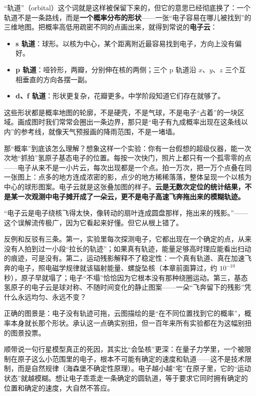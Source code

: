 “轨道”（orbital）这个词就是这样被保留下来的，但它的意思已经彻底换了：一个轨道不是一条路线，而是\textbf{一个概率分布的形状}——一张“电子容易在哪儿被找到”的三维地图。把概率高低用疏密不同的点画出来，就得到常说的\textbf{电子云}：

\begin{itemize}[itemsep=2pt]
\item \textbf{s 轨道}：球形。以核为中心，某个距离附近最容易找到电子，方向上没有偏好。
\item \textbf{p 轨道}：哑铃形，两瓣，分别伸在核的两侧；三个 p 轨道沿 $x$、$y$、$z$ 三个互相垂直的方向各摆一副。
\item \textbf{d、f 轨道}：形状更复杂，花瓣更多。中学阶段知道它们存在就够了。
\end{itemize}

这些形状都是概率地图的轮廓，不是硬壳，不是气球，不是电子“占着”的一块区域。画成图时我们常常会圈出一条边界，那只是“电子有九成概率出现在这条线以内”的参考线，就像天气预报画的降雨范围，不是一堵墙。

那“概率”到底该怎么理解？想象这样一个实验：你有一台假想的超级仪器，能一次次地“抓拍”氢原子基态电子的位置。每按一次快门，照片上都只有一个孤零零的点——电子从来不是一小片云，每次出现都是一个点。拍一万次，把一万个点叠在同一张图上：点多的地方连成浓密的影，点少的地方稀稀落落，整体呈现一个以核为中心的球形图案。电子云就是这张叠加图的样子。\textbf{云是无数次定位的统计结果，不是某一次观测中电子摊开成了一朵云，更不是电子高速飞奔拖出来的模糊轨迹。}

\begin{wuqu}
“电子云是电子绕核飞得太快，像转动的扇叶连成圆盘那样，拖出来的残影。”——这个误解流传极广，因为它看起来好懂。但它从根上错了。

反例和反驳有三条。第一，实验里每次探测电子，它都出现在一个确定的点，从来没有人拍到过一小段“拉长的轨迹”；如果真有轨迹，能量足够高时理应能看出扫动的痕迹，可是没有。第二，运动残影解释不了稳定性：一个真有轨道、真在加速飞奔的电子，照电磁学规律就该辐射能量、螺旋坠核（本章前面算过，约 $10^{-10}$ 秒），原子早就塌了；电子“不塌”恰恰因为它根本没有那种绕圈运动。第三，基态氢原子的电子云是球对称、不随时间变化的静止图案——一朵“飞奔留下的残影”凭什么永远均匀、永远不变？

正确的图景是：电子没有轨迹可拖，云图描绘的是“在不同位置找到它的概率”，概率本身就长那个形状。承认这一点确实别扭，但一百年来所有实验都在为这幅别扭的图景投票。
\end{wuqu}

顺带说一句行星模型真正的死因，其实比“会坠核”更深：在量子力学里，一个被限制在原子这么小范围里的电子，根本不可能有确定的速度和轨道——这不是技术限制，而是自然规律（海森堡不确定性原理）。电子越小越“宅”在原子里，它的“运动状态”就越模糊。想让电子乖乖走一条确定的圆轨道，等于要求它同时拥有确定的位置和确定的速度，大自然不答应。


